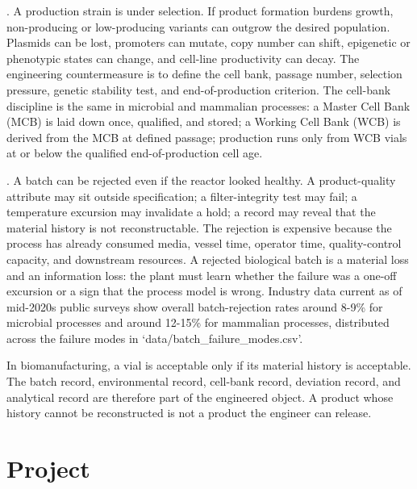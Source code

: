 . A production strain is under
selection. If product formation burdens growth, non-producing or
low-producing variants can outgrow the desired population. Plasmids can
be lost, promoters can mutate, copy number can shift, epigenetic or
phenotypic states can change, and cell-line productivity can decay. The
engineering countermeasure is to define the cell bank, passage number,
selection pressure, genetic stability test, and end-of-production
criterion. The cell-bank discipline is the same in microbial and
mammalian processes: a Master Cell Bank (MCB) is laid down once,
qualified, and stored; a Working Cell Bank (WCB) is derived from the
MCB at defined passage; production runs only from WCB vials at or
below the qualified end-of-production cell age.

. A batch can be rejected even if the reactor
looked healthy. A product-quality attribute may sit outside
specification; a filter-integrity test may fail; a temperature excursion
may invalidate a hold; a record may reveal that the material history is
not reconstructable. The rejection is expensive because the process has
already consumed media, vessel time, operator time, quality-control
capacity, and downstream resources. A rejected biological batch is a
material loss and an information loss: the plant must learn whether the
failure was a one-off excursion or a sign that the process model is
wrong. Industry data current as of mid-2020s public surveys show
overall batch-rejection rates around 8-9\% for microbial processes and
around 12-15\% for mammalian processes, distributed across the failure
modes in `data/batch_failure_modes.csv'.

\begin{principle}
In biomanufacturing, a vial is acceptable only if its material history
is acceptable. The batch record, environmental record, cell-bank record,
deviation record, and analytical record are therefore part of the
engineered object. A product whose history cannot be reconstructed is
not a product the engineer can release.
\end{principle}

\section{Project}

